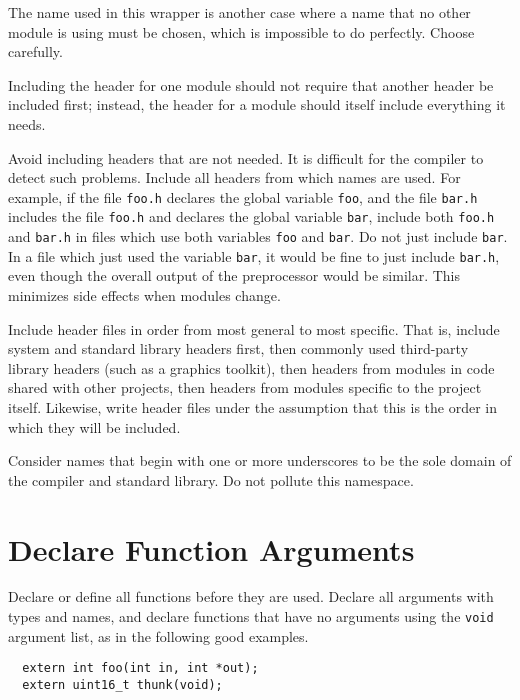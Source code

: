 \documentclass{lulu}
\newcommand{\code}[1]{\texttt{#1}\xspace}
\begin{document}
The name used in this wrapper is another case where a name that no
other module is using must be chosen, which is impossible to do
perfectly.  Choose carefully.

Including the header for one module should not require that another
header be included first; instead, the header for a module should
itself include everything it needs.

Avoid including headers that are not needed.  It is difficult for the
compiler to detect such problems.  Include all headers from which
names are used.  For example, if the file \code{foo.h} declares the
global variable \code{foo}, and the file \code{bar.h} includes the
file \code{foo.h} and declares the global variable \code{bar}, include
both \code{foo.h} and \code{bar.h} in files which use both variables
\code{foo} and \code{bar}.  Do not just include \code{bar}.  In a file
which just used the variable \code{bar}, it would be fine to just
include \code{bar.h}, even though the overall output of the
preprocessor would be similar.  This minimizes side effects when
modules change.

Include header files in order from most general to most specific.
That is, include system and standard library headers first, then
commonly used third-party library headers (such as a graphics
toolkit), then headers from modules in code shared with other
projects, then headers from modules specific to the project itself.
Likewise, write header files under the assumption that this is the
order in which they will be included.

Consider names that begin with one or more underscores to be the sole
domain of the compiler and standard library.  Do not pollute this
namespace.

\section{Declare Function Arguments}

Declare or define all functions before they are used.  Declare all
arguments with types and names, and declare functions that have no
arguments using the \code{void} argument list, as in the following
good examples.

\begin{samepage}
\begin{verbatim}
  extern int foo(int in, int *out);
  extern uint16_t thunk(void);
\end{verbatim}
\end{samepage}
\end{document}
